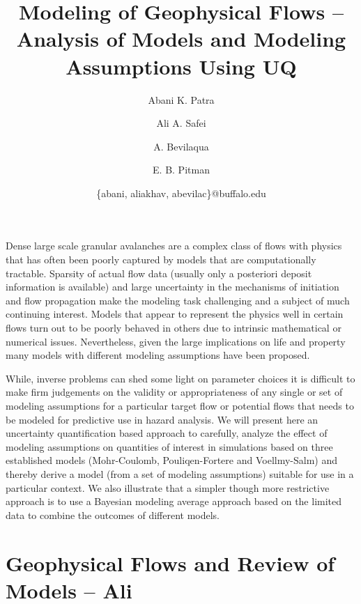 \documentclass{article}
\begin{document}
\title{Modeling of Geophysical Flows -- Analysis of Models and Modeling Assumptions Using UQ}
\author[1,2]{Abani K. Patra}
\author[2]{ Ali A. Safei}
\author[3] {A. Bevilaqua}
\author[4]{E. B. Pitman}

\date{\{abani, aliakhav, abevilac\}@buffalo.edu}


\maketitle

\abstract
Dense large scale granular avalanches are a complex class of flows with physics that has often been poorly captured by models that are computationally tractable. Sparsity of actual flow data (usually only a posteriori  deposit information is available) and large uncertainty in the mechanisms of initiation and flow propagation make the modeling task challenging and a 
subject of much continuing interest. Models that appear to represent the physics well
 in certain flows turn out to be poorly behaved in others due to intrinsic mathematical or numerical issues.  
Nevertheless, given the large implications on life and property many models with different modeling assumptions have been proposed. 

While, inverse problems can shed some light on parameter choices it is difficult to make firm judgements on the validity or appropriateness of any single or set of modeling assumptions for a particular target flow or potential flows that needs to be modeled for predictive use in hazard analysis. We will present here an uncertainty quantification  based approach to carefully, analyze the effect of modeling assumptions on quantities of 
interest in simulations based on three established models (Mohr-Coulomb, Pouliqen-Fortere and Voellmy-Salm) and thereby derive a model (from a set of modeling assumptions) suitable for use in a particular context. We also illustrate that a simpler though more restrictive approach is to use a Bayesian modeling average approach based on the limited data to combine the outcomes of different models.
\newpage
\section{Geophysical Flows and Review of Models -- Ali}
\end{document}
